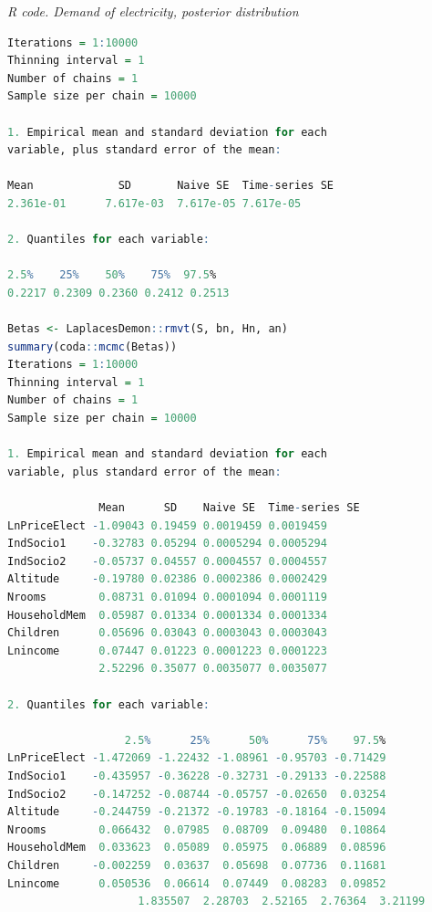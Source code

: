 \begin{tcolorbox}[enhanced,width=4.67in,center upper,
	fontupper=\large\bfseries,drop shadow southwest,sharp corners]
	\textit{R code. Demand of electricity, posterior distribution}
	\begin{VF}
		\begin{lstlisting}[language=R]
Iterations = 1:10000
Thinning interval = 1 
Number of chains = 1 
Sample size per chain = 10000 

1. Empirical mean and standard deviation for each 
variable, plus standard error of the mean:

Mean             SD       Naive SE  Time-series SE 
2.361e-01      7.617e-03  7.617e-05 7.617e-05 
		
2. Quantiles for each variable:

2.5%    25%    50%    75%  97.5% 
0.2217 0.2309 0.2360 0.2412 0.2513 

Betas <- LaplacesDemon::rmvt(S, bn, Hn, an)
summary(coda::mcmc(Betas))
Iterations = 1:10000
Thinning interval = 1 
Number of chains = 1 
Sample size per chain = 10000 

1. Empirical mean and standard deviation for each 
variable, plus standard error of the mean:

              Mean      SD    Naive SE  Time-series SE
LnPriceElect -1.09043 0.19459 0.0019459 0.0019459
IndSocio1    -0.32783 0.05294 0.0005294 0.0005294
IndSocio2    -0.05737 0.04557 0.0004557 0.0004557
Altitude     -0.19780 0.02386 0.0002386 0.0002429
Nrooms        0.08731 0.01094 0.0001094 0.0001119
HouseholdMem  0.05987 0.01334 0.0001334 0.0001334
Children      0.05696 0.03043 0.0003043 0.0003043
Lnincome      0.07447 0.01223 0.0001223 0.0001223
              2.52296 0.35077 0.0035077 0.0035077

2. Quantiles for each variable:

                  2.5%      25%      50%      75%    97.5%
LnPriceElect -1.472069 -1.22432 -1.08961 -0.95703 -0.71429
IndSocio1    -0.435957 -0.36228 -0.32731 -0.29133 -0.22588
IndSocio2    -0.147252 -0.08744 -0.05757 -0.02650  0.03254
Altitude     -0.244759 -0.21372 -0.19783 -0.18164 -0.15094
Nrooms        0.066432  0.07985  0.08709  0.09480  0.10864
HouseholdMem  0.033623  0.05089  0.05975  0.06889  0.08596
Children     -0.002259  0.03637  0.05698  0.07736  0.11681
Lnincome      0.050536  0.06614  0.07449  0.08283  0.09852
			        1.835507  2.28703  2.52165  2.76364  3.21199
		        \end{lstlisting}
	\end{VF}
\end{tcolorbox}

